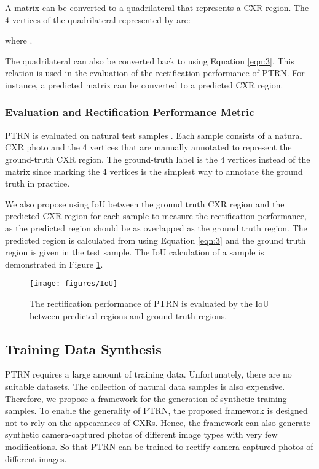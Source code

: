 \documentclass[preprint, 12pt]{elsarticle}
\begin{document}
A matrix  can be converted to a quadrilateral that represents a CXR region. The 4 vertices  of the quadrilateral represented by  are:

where .

The quadrilateral can also be converted back to  using Equation \ref{eqn:3}. This relation is used in the evaluation of the rectification performance of PTRN. For instance, a predicted matrix  can be converted to a predicted CXR region.

\subsubsection{Evaluation and Rectification Performance Metric}

PTRN is evaluated on natural test samples . Each sample consists of a natural CXR photo  and the 4 vertices  
that are manually annotated to represent the ground-truth CXR region. The ground-truth label is the 4 vertices instead of the matrix  since marking the 4 vertices is the simplest way to annotate the ground truth in practice.

We also propose using IoU between the ground truth CXR region and the predicted CXR region for each sample to measure the rectification performance, as the predicted region should be as overlapped as the ground truth region. The predicted region is calculated from  using Equation \ref{eqn:3} and the ground truth region is given in the test sample. The IoU calculation of a sample is demonstrated in Figure \ref{fig:IoU}.

\begin{figure}
    \centering
    \texttt{[image: figures/IoU]}
    \caption{The rectification performance of PTRN is evaluated by the IoU between predicted regions and ground truth regions.}
    \label{fig:IoU}
\end{figure}

\subsection{Training Data Synthesis}

PTRN requires a large amount of training data. Unfortunately, there are no suitable datasets. The collection of natural data samples is also expensive. Therefore, we propose a framework for the generation of synthetic training samples. To enable the generality of PTRN, the proposed framework is designed not to rely on the appearances of CXRs. Hence, the framework can also generate synthetic camera-captured photos of different image types with very few modifications. So that PTRN can be trained to rectify camera-captured photos of different images.
\end{document}
